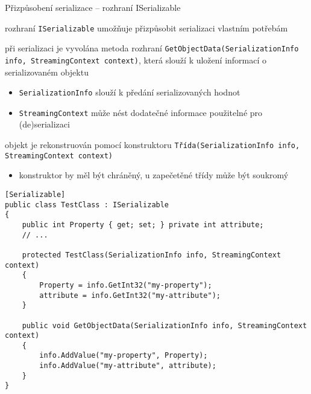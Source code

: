 \begin{frame}[fragile]
\begin{bitemize}{Přizpůsobení serializace -- rozhraní ISerializable}
\item rozhraní \lstinline|ISerializable| umožňuje přizpůsobit serializaci vlastním potřebám
\item při serializaci je vyvolána metoda rozhraní \lstinline|GetObjectData(SerializationInfo info, StreamingContext context)|, která slouží k uložení informací o serializovaném objektu
\begin{itemize}
\item \lstinline|SerializationInfo| slouží k předání serializovaných hodnot
\item \lstinline|StreamingContext| může nést dodatečné informace použitelné pro (de)serializaci
\end{itemize}

\item objekt je rekonstruován pomocí konstruktoru \lstinline|Třída(SerializationInfo info, StreamingContext context)|
\begin{itemize}
\item konstruktor by měl být chráněný, u zapečetěné třídy může být soukromý
\end{itemize}

\end{bitemize}
\end{frame}



\begin{frame}[fragile]
\begin{yesblock}
\begin{lstlisting}
[Serializable]
public class TestClass : ISerializable
{
    public int Property { get; set; } private int attribute;
    // ...

    protected TestClass(SerializationInfo info, StreamingContext context)
    {
        Property = info.GetInt32("my-property");
        attribute = info.GetInt32("my-attribute");
    }

    public void GetObjectData(SerializationInfo info, StreamingContext context)
    {
        info.AddValue("my-property", Property);
        info.AddValue("my-attribute", attribute);
    }
}
\end{lstlisting}
\end{yesblock}
\end{frame}



